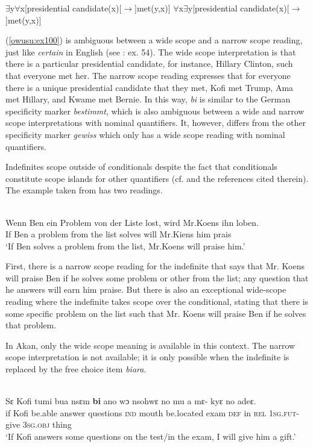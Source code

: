 \documentclass[output=paper,modfonts,nonflat,draftmode]{langsci/langscibook}
\begin{document}
 \ea
 \ea
$\exists$y$\forall$x[presidential candidate(x)[$\rightarrow$]met(y,x)]
\ex $\forall$x$\exists$y[presidential candidate(x)[$\rightarrow$]met(y,x)] 
\z\z

(\ref{owusu:ex100}) is ambiguous between a wide scope and a narrow scope reading, just like \emph{certain} in English  (see \citealt{Farkas2002}: ex. 54). The wide scope interpretation is that there is a particular presidential candidate, for instance, Hillary Clinton, such that everyone met her. The narrow scope reading expresses that for everyone there is a unique presidential candidate that they met, Kofi met Trump, Ama met Hillary, and Kwame met Bernie. In this way, \emph{bi} is similar to the German specificity marker \emph{bestimmt}, which is also ambiguous between a wide and narrow scope interpretations with nominal quantifiers. It, however, differs from the other specificity marker \emph{gewiss} which only has a wide scope reading with nominal quantifiers.               
  
  Indefinites scope outside of conditionals despite the fact that conditionals constitute scope islands for other quantifiers (cf. \citealt{FodorSag1982,Endriss2009} and the references cited therein). The example taken from \citet{Farkas2002} has two readings.

\ea\label{owusu:ex14}\\
\gll Wenn Ben ein Problem von der Liste lost, wird Mr.Koens ihn loben. \\
    If Ben a problem from the list solves will Mr.Kiens him prais\\
\glt `If Ben solves a problem from the list, Mr.Koens will praise him.'
\z

First, there is a narrow scope reading for the indefinite that says that  Mr. Koens will praise Ben if he solves some problem or other from the list; any question that he answers will earn him praise. But there is also an exceptional wide-scope reading where the indefinite takes scope over the conditional, stating that there is some specific problem on the list such that Mr. Koens will praise Ben if he solves that problem. 

In Akan, only the wide scope meaning is available in this context. The narrow scope interpretation is not available; it is only possible when the indefinite is replaced by the free choice item \emph{biara}.



\ea\label{owusu:ex15} \\
\gll  Sε Kofi tumi bua nsεm \textbf{bi} ano wɔ nsohwε no mu a mε- kyε no adeε.\\
 if Kofi be.able answer questions \textsc{ind} mouth be.located exam \textsc{def} in \textsc{rel} \textsc{1sg.fut}- give 3\textsc{sg}.\textsc{obj} thing \\
\glt `If Kofi answers some questions on the test/in the exam, I will give him a gift.'
\z 
\end{document}

